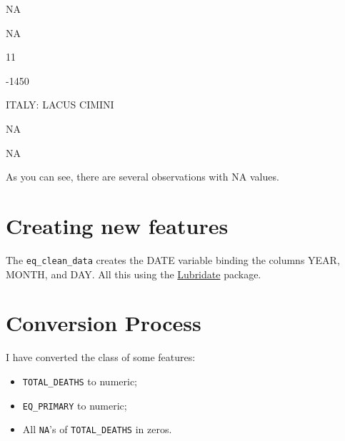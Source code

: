 \documentclass[]{book}
\newenvironment{Shaded}{\begin{snugshade}}{\end{snugshade}}
\newcommand{\KeywordTok}[1]{\textcolor[rgb]{0.13,0.29,0.53}{\textbf{#1}}}
\newcommand{\DataTypeTok}[1]{\textcolor[rgb]{0.13,0.29,0.53}{#1}}
\newcommand{\StringTok}[1]{\textcolor[rgb]{0.31,0.60,0.02}{#1}}
\newcommand{\CommentTok}[1]{\textcolor[rgb]{0.56,0.35,0.01}{\textit{#1}}}
\newcommand{\OperatorTok}[1]{\textcolor[rgb]{0.81,0.36,0.00}{\textbf{#1}}}
\newcommand{\NormalTok}[1]{#1}
\providecommand{\tightlist}{%
  \setlength{\itemsep}{0pt}\setlength{\parskip}{0pt}}
\begin{document}
NA

NA

11

-1450

ITALY: LACUS CIMINI

NA

NA

As you can see, there are several observations with NA values.

\section{Creating new features}\label{new_features}

The \texttt{eq\_clean\_data} creates the DATE variable binding the
columns YEAR, MONTH, and DAY. All this using the
\href{https://lubridate.tidyverse.org}{Lubridate} package.

\begin{Shaded}
\end{Shaded}

\section{Conversion Process}\label{conversion}

I have converted the class of some features:

\begin{itemize}
\tightlist
\item
  \texttt{TOTAL\_DEATHS} to numeric;
\item
  \texttt{EQ\_PRIMARY} to numeric;
\item
  All \texttt{NA}'s of \texttt{TOTAL\_DEATHS} in zeros.
\end{itemize}
\end{document}
